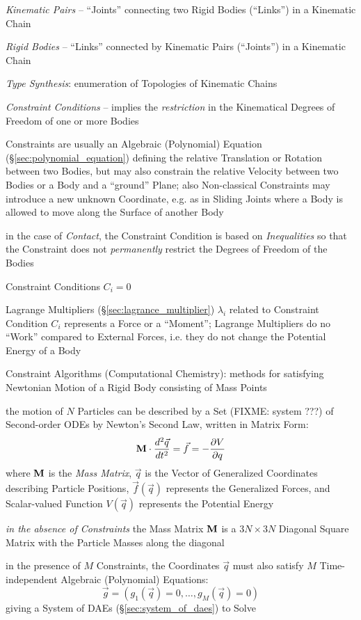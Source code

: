 \emph{Kinematic Pairs} -- ``Joints'' connecting two Rigid Bodies (``Links'') in
a Kinematic Chain

\emph{Rigid Bodies} -- ``Links'' connected by Kinematic Pairs (``Joints'') in a
Kinematic Chain

\emph{Type Synthesis}: enumeration of Topologies of Kinematic Chains

\emph{Constraint Conditions} -- implies the \emph{restriction} in the
Kinematical Degrees of Freedom of one or more Bodies

Constraints are usually an Algebraic (Polynomial) Equation
(\S\ref{sec:polynomial_equation}) defining the relative Translation or Rotation
between two Bodies, but may also constrain the relative Velocity between two
Bodies or a Body and a ``ground'' Plane; also Non-classical Constraints may
introduce a new unknown Coordinate, e.g. as in Sliding Joints where a Body is
allowed to move along the Surface of another Body

in the case of \emph{Contact}, the Constraint Condition is based on
\emph{Inequalities} so that the Constraint does not \emph{permanently} restrict
the Degrees of Freedom of the Bodies

Constraint Conditions $C_i = 0$

Lagrange Multipliers (\S\ref{sec:lagrance_multiplier}) $\lambda_i$ related to
Constraint Condition $C_i$ represents a Force or a ``Moment''; Lagrange
Multipliers do no ``Work'' compared to External Forces, i.e. they do not change
the Potential Energy of a Body

Constraint Algorithms (Computational Chemistry): methods for satisfying
Newtonian Motion of a Rigid Body consisting of Mass Points

the motion of $N$ Particles can be described by a Set (FIXME: system ???) of
Second-order ODEs by Newton's Second Law, written in Matrix Form:
\[
  \mathbf{M} \cdot \frac{d^2\vec{q}}{dt^2}
    = \vec{f} = -\frac{\partial{V}}{\partial{q}}
\]
where $\mathbf{M}$ is the \emph{Mass Matrix}, $\vec{q}$ is the Vector of
Generalized Coordinates describing Particle Positions, $\vec{f}(\vec{q})$
represents the Generalized Forces, and Scalar-valued Function $V(\vec{q})$
represents the Potential Energy

\emph{in the absence of Constraints} the Mass Matrix $\mathbf{M}$ is a $3N \times
3N$ Diagonal Square Matrix with the Particle Masses along the diagonal

in the presence of $M$ Constraints, the Coordinates $\vec{q}$ must also satisfy
$M$ Time-independent Algebraic (Polynomial) Equations:
\[
  \vec{g} = (g_1(\vec{q}) = 0, \ldots, g_M(\vec{q}) = 0)
\]
giving a System of DAEs (\S\ref{sec:system_of_daes}) to Solve

